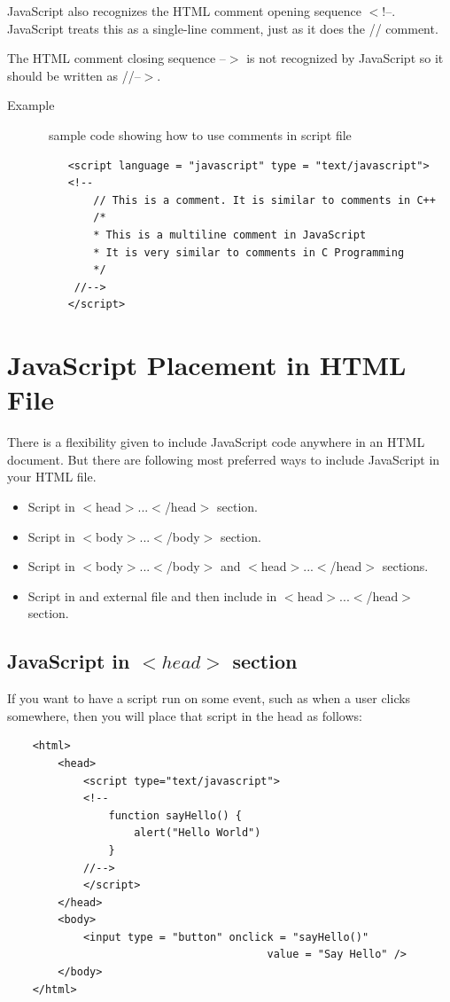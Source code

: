 \documentclass[11pt,a4paper]{article}
\begin{document}
JavaScript also recognizes the HTML comment opening sequence $<$!--. JavaScript treats this as a single-line comment, just as it does the // comment.

The HTML comment closing sequence --$>$ is not recognized by JavaScript so it should be written as //--$>$.\\

\begin{description}
\item[Example]\
sample code showing how to use comments  in script file
\begin{verbatim}
    <script language = "javascript" type = "text/javascript">
    <!--
        // This is a comment. It is similar to comments in C++
        /*
        * This is a multiline comment in JavaScript
        * It is very similar to comments in C Programming
        */
     //-->
    </script>
\end{verbatim}
\end{description}

\section*{JavaScript Placement in HTML File}

There is a flexibility given to include JavaScript code anywhere in an HTML document. But there are following most preferred ways to include JavaScript in your HTML file.
\begin{itemize}
\item Script in $<$head$>$...$<$/head$>$ section.
\item Script in $<$body$>$...$<$/body$>$ section.
\item Script in $<$body$>$...$<$/body$>$ and $<$head$>$...$<$/head$>$ sections.
\item Script in and external file and then include in $<$head$>$...$<$/head$>$ section.
\end{itemize}

\subsection*{JavaScript in $<head>$ section}

If you want to have a script run on some event, such as when a user clicks somewhere, then you will place that script in the head as follows:
\begin{verbatim}
    <html>
        <head>
            <script type="text/javascript">
            <!--
                function sayHello() {
                    alert("Hello World")
                }
            //-->
            </script>
        </head>
        <body>
            <input type = "button" onclick = "sayHello()"
                                         value = "Say Hello" />
        </body>
    </html>
\end{verbatim}
\end{document}
